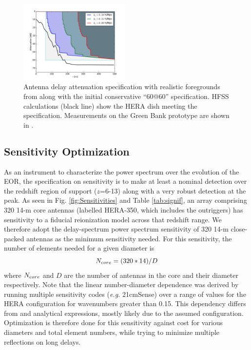\documentclass[preprint,11pt]{aastex}
\begin{document}
\begin{figure}[h!]
	\centering
    \includegraphics[width=0.49\textwidth]{plots/delayspecplot.pdf}
	\caption{Antenna delay attenuation specification with realistic foregrounds from \cite{thyagarajan_et_al2016} along with the initial conservative ``60@60'' specification.  HFSS calculations (black line) show the HERA dish meeting the specification.  Measurements on the Green Bank prototype are shown in  \citep{patra_et_al2016}.
}
	\label{fig:delayspec}
	\vspace{-10pt}
\end{figure}

\subsection{Sensitivity Optimization}
\label{sec:cost}
As an instrument to characterize the power spectrum over the evolution of the EOR, the specification on sensitivity is to make at least a nominal detection over the redshift region of support ($z$=6-13) along with a very robust detection at the peak.  As seen in Fig. \ref{fig:Sensitivities} and Table \ref{tab:signif}, an array comprising 320 14-m core antennas (labelled HERA-350, which includes the outriggers) has sensitivity to a
fiducial reionization model across that redshift range.  We therefore adopt the delay-spectrum power spectrum sensitivity of 320 14-m close-packed antennas as the minimum sensitivity needed.  
For this sensitivity, the number of elements needed for a given diameter is
\begin{equation}
\label{eq:ND}
N_{\text core} = (320*14)/D
\end{equation}
where $N_{\text core}$ and $D$ are the number of antennas in the core and their diameter respectively.  Note that the linear number-diameter dependence was derived by running multiple sensitivity codes ({\em e.g.} 21cmSense) over a range of values for the HERA configuration for wavenumbers greater than 0.15.  This dependency differs from \cite{2013ExA....36..235M} and analytical expressions, mostly likely due to the assumed configuration.
Optimization is 
therefore done for this sensitivity against cost for various diameters and total element numbers, while trying to minimize multiple reflections on long delays.   
\end{document}
